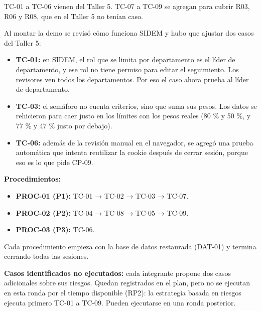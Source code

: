 \documentclass[11pt,a4paper,oneside]{report}
\begin{document}
\begin{nota}
TC-01 a TC-06 vienen del Taller 5. TC-07 a TC-09 se agregan para cubrir R03, R06 y R08, que en el Taller 5 no tenían caso.


Al montar la demo se revisó cómo funciona SIDEM y hubo que ajustar dos casos del Taller 5:


\begin{itemize}
\item \textbf{TC-01:} en SIDEM, el rol que se limita por departamento es el líder de departamento, y ese rol no tiene permiso para editar el seguimiento. Los revisores ven todos los departamentos. Por eso el caso ahora prueba al líder de departamento.
\item \textbf{TC-03:} el semáforo no cuenta criterios, sino que suma sus pesos. Los datos se rehicieron para caer justo en los límites con los pesos reales (80 \% y 50 \%, y 77 \% y 47 \% justo por debajo).
\end{itemize}
\end{nota}

\begin{nota}
\begin{itemize}
\item \textbf{TC-06:} además de la revisión manual en el navegador, se agregó una prueba automática que intenta reutilizar la cookie después de cerrar sesión, porque eso es lo que pide CP-09.
\end{itemize}
\end{nota}

\textbf{Procedimientos:}


\begin{itemize}
\item \textbf{PROC-01 (P1):} TC-01 → TC-02 → TC-03 → TC-07.
\item \textbf{PROC-02 (P2):} TC-04 → TC-08 → TC-05 → TC-09.
\item \textbf{PROC-03 (P3):} TC-06.
\end{itemize}

Cada procedimiento empieza con la base de datos restaurada (DAT-01) y termina cerrando todas las sesiones.


\textbf{Casos identificados no ejecutados:} cada integrante propone dos casos adicionales sobre sus riesgos. Quedan registrados en el plan, pero no se ejecutan en esta ronda por el tiempo disponible (RP2): la estrategia basada en riesgos ejecuta primero TC-01 a TC-09. Pueden ejecutarse en una ronda posterior.
\end{document}
